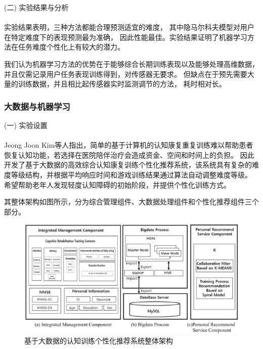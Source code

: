 \documentclass{article}
\begin{document}
            (二) 实验结果与分析\paragraph{}
            实验结果表明，三种方法都能合理预测适宜的难度，
            其中隐马尔科夫模型对用户在特定难度下的表现预测最为准确，
            因此性能最佳。实验结果证明了机器学习方法在任务难度个性化上有较大的潜力。

            我们认为机器学习方法的优势在于能够综合长期训练表现以及能够处理高维数据，
            并且仅需记录用户任务表现训练得到，对传感器无要求。
            但缺点在于预先需要大量的训练数据，并且相比起传感器实时监测调节的方法，
            耗时相对长。

            \subsubsection{大数据与机器学习}
            (一) 实验设置\paragraph{}
            Jeong Joon Kim\cite{ref11}等人指出，简单的基于计算机的认知康复重复训练难以帮助患者恢复认知功能，若选择在医院陪伴治疗会造成资金、空间和时间上的负担。
            因此开发了基于大数据的高效综合认知康复训练个性化推荐系统，该系统具有复杂的难度等级结构，并根据平均响应时间和游戏训练结果通过算法自动调整难度等级。
            希望帮助老年人发现轻度认知障碍的初始阶段，并提供个性化训练方式。

            其整体架构如图所示，分为综合管理组件、大数据处理组件和个性化推荐组件三个部分。
            \begin{figure}[H]
            	
            	\centering
            	\includegraphics[scale=0.7]{images/Overall_architecture.png}
            	\caption{基于大数据的认知训练个性化推荐系统整体架构}
            	\label{fig:label}
            \end{figure}
\end{document}
